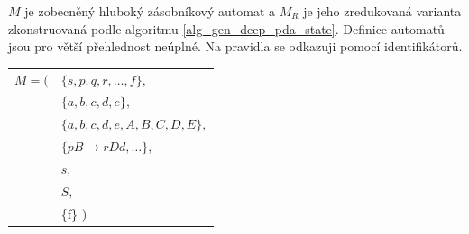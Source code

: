 
\newpage
\begin{Example}\label{example_state}
$M$ je zobecněný hluboký zásobníkový automat a $M_{R}$ je jeho zredukovaná varianta zkonstruovaná podle algoritmu \ref{alg_gen_deep_pda_state}. Definice automatů jsou pro větší přehlednost neúplné. Na pravidla se odkazuji pomocí identifikátorů.
\bigskip

\setlength{\deftabcolsep}{\tabcolsep}
\setlength{\tabcolsep}{1pt}

\begin{tabular}{ll}

$M = ($&$\{s,p,q,r,\dots,f\},$ \\
     &$\{a,b,c,d,e\}, $\\
     &$\{a,b,c,d,e,A,B,C,D,E\},$ \\
     &$\{pB \rightarrow r Dd, \dots\},$\\
     &$s,$ \\
     &$S,$ \\
     &\{f\} )
\end{tabular}

\bigskip



\begin{tabular}{llp{12cm}l}


\end{tabular}
\end{Example}
